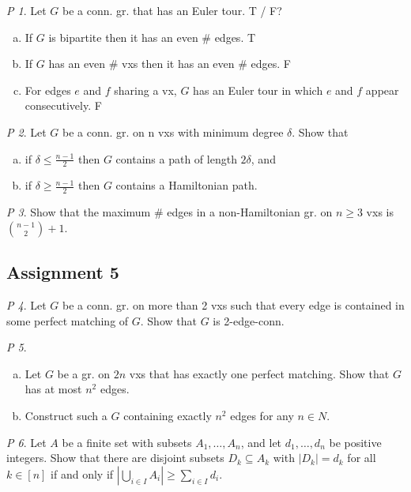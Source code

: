 \documentclass[11pt, fleqn, a4paper, landscape]{article}
\theoremstyle{plain} %
\theoremstyle{remark} %
\newtheorem{problem}{P}
\theoremstyle{definition} %
\begin{document}
\begin{multicols}{5}
\begin{problem}
Let $G$ be a conn. gr. that has an Euler tour. T / F?
\begin{enumerate}[(a)]
\item If $G$ is bipartite then it has an even \# edges. T
\item If $G$ has an even \# vxs then it has an even \# edges. F
\item For edges $e$ and $f$ sharing a vx, $G$ has an Euler tour in which $e$ and $f$ appear consecutively. F
\end{enumerate}
\end{problem}

\begin{problem}
Let $G$ be a conn. gr. on n vxs with minimum degree $\delta$. Show that 
\begin{enumerate}[(a)]
\item if $\delta \le \frac{n-1}{2}$ then $G$ contains a path of length $2\delta$, and
\item if $\delta \ge \frac{n-1}{2}$ then $G$ contains a Hamiltonian path.
\end{enumerate}
\end{problem}

\begin{problem}
Show that the maximum \# edges in a non-Hamiltonian gr. on $n \ge 3$
vxs is $\binom{n-1}{2}+1$.
\end{problem}

\subsection{Assignment 5}

\begin{problem}
Let $G$ be a conn. gr. on more than 2 vxs such that every edge is
contained in some perfect matching of $G$. Show that $G$ is 2-edge-conn.
\end{problem}

\begin{problem}
\begin{enumerate}[(a)]
\item Let $G$ be a gr. on $2n$ vxs that has exactly one perfect matching. Show that $G$ has at most $n^2$ edges.
\item Construct such a $G$ containing exactly $n^2$ edges for any $n \in N$.
\end{enumerate}
\end{problem}

\begin{problem}
Let $A$ be a finite set with subsets $A_1,\dots, A_n$, and let $d_1,\dots, d_n$ be positive integers. Show that there are disjoint subsets $D_k \subseteq A_k$ with $|D_k| = d_k$ for all $k \in [n]$ if and
only if $|\bigcup_{i\in I}A_i|\ge \sum_{i\in I}d_i$.
\end{problem}


\end{multicols}
\end{document}

